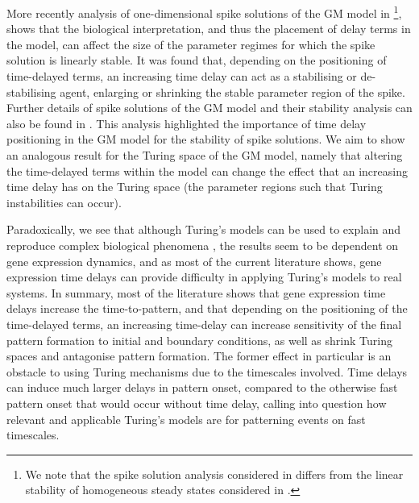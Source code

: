 More recently analysis of one-dimensional spike solutions of the GM model in \cite{fadai1,fadai2}\footnote{We note that the spike solution analysis considered in \cite{fadai1,fadai2} differs from the linear stability of homogeneous steady states considered in \cite{leegaffmonk,gaffmonk,leegaffney}.}, shows that the biological interpretation, and thus the placement of delay terms in the model, can affect the size of the parameter regimes for which the spike solution is linearly stable. It was found that, depending on the positioning of time-delayed terms, an increasing time delay can act as a stabilising or de-stabilising agent, enlarging or shrinking the stable parameter region of the spike. Further details of spike solutions of the GM model and their stability analysis can also be found in \cite{spike}. This analysis highlighted the importance of time delay positioning in the GM model for the stability of spike solutions. We aim to show an analogous result for the Turing space of the GM model, namely that altering the time-delayed terms within the model can change the effect that an increasing time delay has on the Turing space (the parameter regions such that Turing instabilities can occur).

Paradoxically, we see that although Turing's models can be used to explain and reproduce complex biological phenomena \cite{leegaffney}, the results seem to be dependent on gene expression dynamics, and as most of the current literature shows, gene expression time delays can provide difficulty in applying Turing's models to real systems. In summary, most of the literature shows that gene expression time delays increase the time-to-pattern, and that depending on the positioning of the time-delayed terms, an increasing time-delay can increase sensitivity of the final pattern formation to initial and boundary conditions, as well as shrink Turing spaces and antagonise pattern formation. The former effect in particular is an obstacle to using Turing mechanisms due to the timescales involved. Time delays can induce much larger delays in pattern onset, compared to the otherwise fast pattern onset that would occur without time delay, calling into question how relevant and applicable Turing's models are for patterning events on fast timescales.

